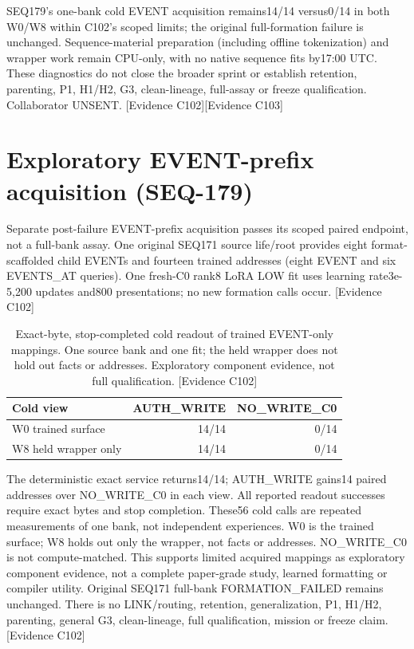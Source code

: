 \documentclass[11pt]{article}
\newcommand{\ev}[1]{\textsf{[Evidence #1]}}
\begin{document}
SEQ179's one-bank cold EVENT acquisition remains14/14 versus0/14 in both
W0/W8 within C102's scoped limits; the original full-formation failure is
unchanged. Sequence-material preparation (including offline tokenization)
and wrapper work remain CPU-only, with no native sequence fits by17:00 UTC.
These diagnostics do not close the broader sprint or establish retention,
parenting, P1, H1/H2, G3, clean-lineage, full-assay or freeze qualification.
Collaborator UNSENT. \ev{C102}\ev{C103}

\section{Exploratory EVENT-prefix acquisition (SEQ-179)}
Separate post-failure EVENT-prefix acquisition passes its scoped paired
endpoint, not a full-bank assay. One original SEQ171 source life/root provides
eight format-scaffolded child EVENTs and fourteen trained addresses (eight
EVENT and six EVENTS\_AT queries). One fresh-C0 rank8 LoRA LOW fit uses learning
rate3e-5,200 updates and800 presentations; no new formation calls occur. \ev{C102}

\begin{table}[ht]
\centering\small
\begin{tabular}{lrr}
\toprule
Cold view & AUTH\_WRITE & NO\_WRITE\_C0 \\
\midrule
W0 trained surface & 14/14 & 0/14 \\
W8 held wrapper only & 14/14 & 0/14 \\
\bottomrule
\end{tabular}
\caption{Exact-byte, stop-completed cold readout of trained EVENT-only mappings.
One source bank and one fit; the held wrapper does not hold out facts or
addresses. Exploratory component evidence, not full qualification. \ev{C102}}
\end{table}

The deterministic exact service returns14/14; AUTH\_WRITE gains14 paired
addresses over NO\_WRITE\_C0 in each view. All reported readout successes require
exact bytes and stop completion. These56 cold calls are repeated measurements
of one bank, not independent experiences. W0 is the trained surface; W8 holds
out only the wrapper, not facts or addresses. NO\_WRITE\_C0 is not compute-matched.
This supports limited acquired mappings as exploratory component evidence,
not a complete paper-grade study, learned formatting or compiler utility.
Original SEQ171 full-bank FORMATION\_FAILED remains unchanged. There is no
LINK/routing, retention, generalization, P1, H1/H2, parenting, general G3,
clean-lineage, full qualification, mission or freeze claim. \ev{C102}
\end{document}
